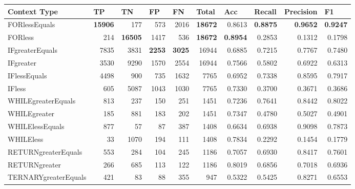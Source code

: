 \begin{appendices}
\begin{table}[htbp]
\begin{tabular}{|l|r|r|r|r|r|r|r|r|r|}
\hline
\textbf{Context Type} & \multicolumn{1}{l|}{\textbf{TP}} & \multicolumn{1}{l|}{\textbf{TN}} & \multicolumn{1}{l|}{\textbf{FP}} & \multicolumn{1}{l|}{\textbf{FN}} & \multicolumn{1}{l|}{\textbf{Total}} & \multicolumn{1}{l|}{\textbf{Acc}} & \multicolumn{1}{l|}{\textbf{Recall}} & \multicolumn{1}{l|}{\textbf{Precision}} & \multicolumn{1}{l|}{\textbf{F1}} \\ \hline
FORlessEquals & \textbf{15906} & 177 & 573 & 2016 & \textbf{18672} & 0.8613 & \textbf{0.8875} & \textbf{0.9652} & \textbf{0.9247} \\ \hline
FORless & 214 & \textbf{16505} & 1417 & 536 & \textbf{18672} & \textbf{0.8954} & 0.2853 & 0.1312 & 0.1798 \\ \hline
IFgreaterEquals & 7835 & 3831 & \textbf{2253} & \textbf{3025} & 16944 & 0.6885 & 0.7215 & 0.7767 & 0.7480 \\ \hline
IFgreater & 3530 & 9290 & 1570 & 2554 & 16944 & 0.7566 & 0.5802 & 0.6922 & 0.6313 \\ \hline
IFlessEquals & 4498 & 900 & 735 & 1632 & 7765 & 0.6952 & 0.7338 & 0.8595 & 0.7917 \\ \hline
IFless & 605 & 5087 & 1043 & 1030 & 7765 & 0.7330 & 0.3700 & 0.3671 & 0.3686 \\ \hline
WHILEgreaterEquals & 813 & 237 & 150 & 251 & 1451 & 0.7236 & 0.7641 & 0.8442 & 0.8022 \\ \hline
WHILEgreater & 185 & 881 & 183 & 202 & 1451 & 0.7347 & 0.4780 & 0.5027 & 0.4901 \\ \hline
WHILElessEquals & 877 & 57 & 87 & 387 & 1408 & 0.6634 & 0.6938 & 0.9098 & 0.7873 \\ \hline
WHILEless & 33 & 1070 & 194 & 111 & 1408 & 0.7834 & 0.2292 & 0.1454 & 0.1779 \\ \hline
RETURNgreaterEquals & 553 & 284 & 104 & 245 & 1186 & 0.7057 & 0.6930 & 0.8417 & 0.7601 \\ \hline
RETURNgreater & 266 & 685 & 113 & 122 & 1186 & 0.8019 & 0.6856 & 0.7018 & 0.6936 \\ \hline
TERNARYgreaterEquals & 421 & 83 & 88 & 355 & 947 & 0.5322 & 0.5425 & 0.8271 & 0.6553 \\ \hline

\end{tabular}
\end{table}
\end{appendices}
